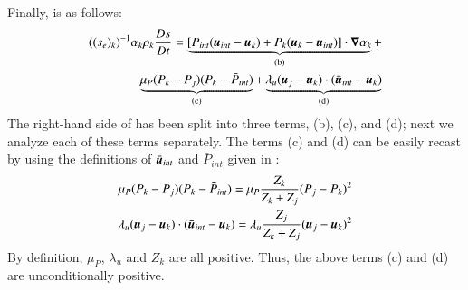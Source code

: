 \documentclass[preprint,10pt]{elsarticle}
\begin{document}
\begin{appendices}
Finally, is as follows:
\begin{eqnarray}
\label{eq:ent3}
((s_e)_k)^{-1} \alpha_k \rho_k \frac{Ds}{Dt} = \underbrace{\left[ P_{int} (\boldsymbol u_{int}-\boldsymbol u_k) + P_k (\boldsymbol u_k-\boldsymbol u_{int}) \right] \cdot \boldsymbol\nabla \alpha_k}_\textrm{(b)} + \nonumber\\ 
\underbrace{\mu_P (P_k-P_j)(P_k-\bar{P}_{int})}_\textrm{(c)} + \underbrace{\lambda_u(\boldsymbol u_j-\boldsymbol u_k)\cdot(\bar{\boldsymbol u}_{int}-\boldsymbol u_k)}_\textrm{(d)}
\end{eqnarray}
The right-hand side of  has been split into three terms, (b), (c), and (d); next we analyze each of these terms separately. The terms (c) and (d) can be easily recast by using the definitions of $\bar{\boldsymbol u}_{int}$ and $\bar{P}_{int}$ given in :
\begin{eqnarray}
\label{eq:ent4}
\mu_P (P_k-P_j)(P_k-\bar{P}_{int}) = \mu_P \frac{Z_k}{Z_k+Z_j} (P_j - P_k)^2\nonumber\\
\lambda_u(\boldsymbol u_j-\boldsymbol u_k)\cdot(\bar{\boldsymbol u}_{int}-\boldsymbol u_k) = \lambda_u \frac{Z_j}{Z_k+Z_j} (\boldsymbol u_j - \boldsymbol u_k)^2 
\end{eqnarray}
By definition, $\mu_P$, $\lambda_u$ and $Z_k$ are all positive. Thus, the above terms (c) and (d) are unconditionally positive. 


\end{appendices}
\end{document}
